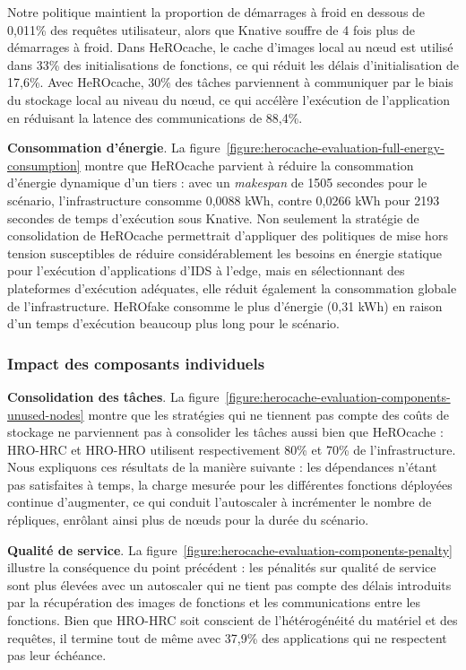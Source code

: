 Notre politique maintient la proportion de démarrages à froid en dessous de 0,011\% des requêtes utilisateur, alors que Knative souffre de 4 fois plus de démarrages à froid. Dans HeROcache, le cache d'images local au nœud est utilisé dans 33\% des initialisations de fonctions, ce qui réduit les délais d'initialisation de 17,6\%.
Avec HeROcache, 30\% des tâches parviennent à communiquer par le biais du stockage local au niveau du nœud, ce qui accélère l'exécution de l'application en réduisant la latence des communications de 88,4\%.

\textbf{Consommation d'énergie}. La figure~\ref{figure:herocache-evaluation-full-energy-consumption} montre que HeROcache parvient à réduire la consommation d'énergie dynamique d'un tiers : avec un \textit{makespan} de 1505 secondes pour le scénario, l'infrastructure consomme 0,0088 kWh, contre 0,0266 kWh pour 2193 secondes de temps d'exécution sous Knative. Non seulement la stratégie de consolidation de HeROcache permettrait d'appliquer des politiques de mise hors tension susceptibles de réduire considérablement les besoins en énergie statique pour l'exécution d'applications d'IDS à l'edge, mais en sélectionnant des plateformes d'exécution adéquates, elle réduit également la consommation globale de l'infrastructure. HeROfake consomme le plus d'énergie (0,31 kWh) en raison d'un temps d'exécution beaucoup plus long pour le scénario.

\subsubsection{Impact des composants individuels}

\textbf{Consolidation des tâches}. La figure~\ref{figure:herocache-evaluation-components-unused-nodes} montre que les stratégies qui ne tiennent pas compte des coûts de stockage ne parviennent pas à consolider les tâches aussi bien que HeROcache : HRO-HRC et HRO-HRO utilisent respectivement 80\% et 70\% de l'infrastructure. Nous expliquons ces résultats de la manière suivante : les dépendances n'étant pas satisfaites à temps, la charge mesurée pour les différentes fonctions déployées continue d'augmenter, ce qui conduit l'autoscaler à incrémenter le nombre de répliques, enrôlant ainsi plus de nœuds pour la durée du scénario.

\textbf{Qualité de service}. La figure~\ref{figure:herocache-evaluation-components-penalty} illustre la conséquence du point précédent : les pénalités sur qualité de service sont plus élevées avec un autoscaler qui ne tient pas compte des délais introduits par la récupération des images de fonctions et les communications entre les fonctions. Bien que HRO-HRC soit conscient de l'hétérogénéité du matériel et des requêtes, il termine tout de même avec 37,9\% des applications qui ne respectent pas leur échéance.

